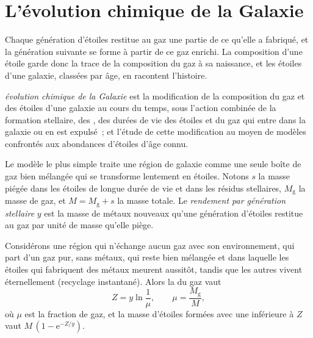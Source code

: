 \section{L'évolution chimique de la Galaxie}\label{sec:b3:origin-of-elements:gce}

Chaque génération d'étoiles restitue au gaz une partie de ce qu'elle a fabriqué, et
la génération suivante se forme à partir de ce gaz enrichi. La composition d'une
étoile garde donc la trace de la composition du gaz à sa naissance, et les
étoiles d'une galaxie, classées par âge, en racontent l'histoire.

\begin{definition}\label{def:b3:origin-of-elements:gce}
\emph{évolution chimique de la Galaxie}
est la modification de la composition du gaz et des étoiles d'une
galaxie au cours du temps, sous l'action combinée de la formation stellaire, des
, des durées de vie des étoiles et du gaz qui entre dans
la galaxie ou en est expulsé~; et l'étude de cette modification au moyen de
modèles confrontés aux abondances d'étoiles d'âge connu.
\end{definition}

Le modèle le plus simple traite une région de galaxie comme une seule boîte de
gaz bien mélangée qui se transforme lentement en étoiles. Notons $s$ la masse piégée dans
les étoiles de longue durée de vie et dans les résidus stellaires, $M_\mathrm{g}$ la masse de
gaz, et $M = M_\mathrm{g} + s$ la masse totale. Le \emph{rendement par
génération stellaire} $y$ est la masse de métaux nouveaux qu'une génération d'étoiles
restitue au gaz par unité de masse qu'elle piège.

\begin{theorem}\label{thm:b3:origin-of-elements:closed-box}
Considérons une région qui n'échange aucun gaz avec son environnement, qui part
d'un gaz pur, sans métaux, qui reste bien mélangée et dans laquelle les étoiles qui
fabriquent des métaux meurent aussitôt, tandis que les autres vivent éternellement (recyclage
instantané). Alors la  du gaz vaut
\[
Z = y \ln\frac{1}{\mu}, \qquad \mu = \frac{M_\mathrm{g}}{M},
\]
où $\mu$ est la fraction de gaz, et la masse d'étoiles formées avec une
 inférieure à $Z$ vaut \mbox{$M\,(1 - \mathrm{e}^{-Z/y})$}.
\end{theorem}


